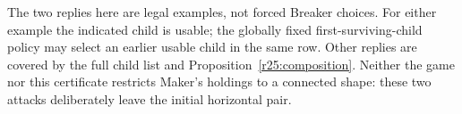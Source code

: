 The two replies here are legal examples, not forced Breaker choices.
For either example the indicated child is usable; the globally fixed
first-surviving-child policy may select an earlier usable child in
the same row.  Other replies are covered by the full child list and
Proposition~\ref{r25:composition}.  Neither the game nor this
certificate restricts Maker's holdings to a connected shape: these
two attacks deliberately leave the initial horizontal pair.
